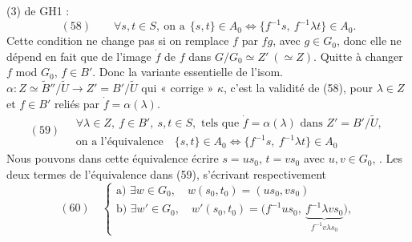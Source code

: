 \documentclass[11pt,a4paper]{article}
\begin{document}

 \struck{\ill{}} 

 

     
  
 \struck{$\iff$}   
  

      

(3) de GH1 :
\[
(58)\qquad \forall s,t\in S,\ \text{on a}\ \ \{s,t\}\in A_0\iff\{f^{-1}s,\ f^{-1}\lambda t\}\in A_0 .
\]
 Cette condition ne change pas si on \struck{\ill{}} remplace $f$ par $fg$, avec $g\in G_0$, donc elle ne dépend en fait que de l'image $\dot{f}$ de $f$ dans $G/G_0\simeq Z'\ (\simeq Z)$. Quitte à changer $f$ mod $G_0$,  $f\in B'$. Donc la variante essentielle de l'isom. $\alpha : Z\simeq\tilde{B}''/\tilde{U}\to Z'=B'/\tilde{U}$ qui « corrige » $\kappa$, c'est la validité de (58), pour $\lambda\in Z$ et $f\in B'$ reliés par $\dot{f}=\alpha(\lambda)$.
\[
(59)\quad
\begin{array}{l}
\forall\lambda\in Z,\ f\in B',\ s,t\in S, \text{ tels que } \dot{f}=\alpha(\lambda) \text{ dans } Z'=B'/\tilde{U},\\
\text{on a l'équivalence}\quad \{s,t\}\in A_0\iff\{f^{-1}s,\ f^{-1}\lambda t\}\in A_0
\end{array}
\]
Nous pouvons dans cette équivalence écrire $s=us_0$, $t=vs_0$ avec $u,v\in G_0$, . Les deux termes de l'équivalence dans (59), s'écrivant respectivement
\[
(60)\quad
\begin{cases}
\text{a) } \exists w\in G_0,\quad w(s_0,t_0)=(us_0,vs_0)\\
\text{b) } \exists w'\in G_0,\quad w'(s_0,t_0)=\bigl(f^{-1}us_0,\ \underbrace{f^{-1}\lambda vs_0}_{f^{-1}v\lambda s_0}\bigr),
\end{cases}
\]
\end{document}
